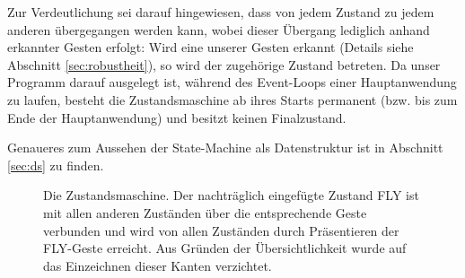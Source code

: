 	Zur Verdeutlichung sei darauf hingewiesen, dass von jedem Zustand zu jedem anderen übergegangen werden kann, wobei dieser Übergang lediglich anhand erkannter Gesten erfolgt: Wird eine unserer Gesten erkannt (Details siehe Abschnitt \ref{sec:robustheit}), so wird der zugehörige Zustand betreten. Da unser Programm darauf ausgelegt ist, während des Event-Loops einer Hauptanwendung zu laufen, besteht die Zustandsmaschine ab ihres Starts permanent (bzw. bis zum Ende der Hauptanwendung) und besitzt keinen Finalzustand.\par
	Genaueres zum Aussehen der State-Machine als Datenstruktur ist in Abschnitt \ref{sec:ds} zu finden.
	\begin{figure}[h!]
	\centering
	
	\caption{Die Zustandsmaschine. Der nachträglich eingefügte Zustand FLY ist mit allen anderen Zuständen über die entsprechende Geste verbunden und wird von allen Zuständen durch Präsentieren der FLY-Geste erreicht. Aus Gründen der Übersichtlichkeit wurde auf das Einzeichnen dieser Kanten verzichtet.}\label{fig:sm}
	\end{figure}